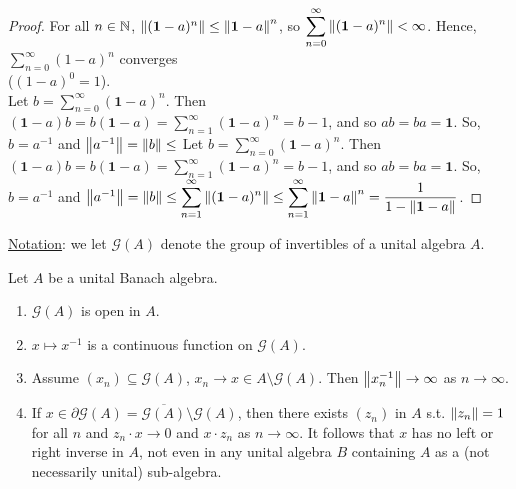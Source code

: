 \documentclass{article}
\begin{document}
\begin{proof}
    For all $n\in \mathbb{N}$, $\left\lVert(\mathbf{1}-a)^n\right\rVert\leq \left\lVert\mathbf{1}-a\right\rVert^n$, so $\displaystyle\sum^\infty_{n=0} \left\lVert(\mathbf{1}-a)^n\right\rVert<\infty$. Hence, $\displaystyle\sum^\infty_{n=0}(1-a)^n$ converges \\($(1-a)^0=1$).\\

    Let $b = \displaystyle\sum^\infty_{n=0}(\mathbf{1}-a)^n$. Then $(\mathbf{1}-a)b=b(\mathbf{1}-a)=\displaystyle\sum^\infty_{n=1}(\mathbf{1}-a)^n=b-1$, and so $ab=ba=\mathbf{1}$. So, $b = a^{-1}$ and $\left\lVert a^{-1}\right\rVert=\left\lVert b\right\rVert\leq $
    Let $b = \displaystyle\sum^\infty_{n=0}(\mathbf{1}-a)^n$. Then $(\mathbf{1}-a)b=b(\mathbf{1}-a)=\displaystyle\sum^\infty_{n=1}(\mathbf{1}-a)^n=b-1$, and so $ab=ba=\mathbf{1}$. So, $b = a^{-1}$ and $\left\lVert a^{-1}\right\rVert=\left\lVert b\right\rVert\leq \displaystyle\sum^\infty_{n=1}\left\lVert(\mathbf{1}-a)^n\right\rVert\leq \displaystyle\sum^\infty_{n=1}\left\lVert\mathbf{1}-a\right\rVert^n=\frac{1}{1-\left\lVert\mathbf{1}-a\right\rVert}$.
\end{proof}

\noindent\underline{Notation}: we let $\mathcal{G}(A)$ denote the group of invertibles of a unital algebra $A$.

\begin{boxcor}\label{cor: invertibles conv}
    Let $A$ be a unital Banach algebra. 
    \begin{enumerate}[label = (\roman*), align = left]
        \item $\mathcal{G}(A)$ is open in $A$.
        \item $x\mapsto x^{-1}$ is a continuous function on $\mathcal{G}(A)$.
        \item Assume $(x_n)\subseteq\mathcal{G}(A)$, $x_n\to x\in A\setminus\mathcal{G}(A)$. Then $\left\lVert x_n^{-1}\right\rVert\to \infty$ as $n\to \infty$.
        \item If $x\in \partial \mathcal{G}(A) = \overline{\mathcal{G}(A)}\setminus \mathcal{G}(A)$, then there exists $(z_n)$ in $A$ s.t. $\left\lVert z_n\right\rVert=1$ for all $n$ and $z_n\cdot x\to 0$ and $x\cdot z_n$ as $n\to \infty$. It follows that $x$ has no left or right inverse in $A$, not even in any unital algebra $B$ containing $A$ as a (not necessarily unital) sub-algebra.
    \end{enumerate}
\end{boxcor}
\end{document}
